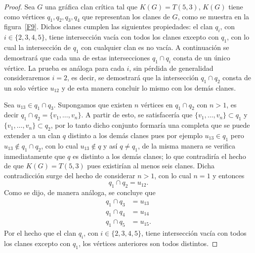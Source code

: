 \documentclass[12pt]{book}
\theoremstyle{definition}
\begin{document}
\begin{proof}
Sea $G$ una gráfica clan crítica tal que $K(G)=T(5,3)$, $K(G)$ tiene como vértices $q_1,q_2,q_3,q_4$ que representan los clanes de $G$, como se muestra en la figura~\ref{F9}. Dichos clanes cumplen las siguientes propiedades: el clan $q_i$, con $i\in \{2,3,4,5\}$, tiene intersección vacía con todos los clanes excepto con $q_1$, con lo cual la intersección de $q_1$ con cualquier clan es no vacía. 
A continuación se demostrará que cada una de estas intersecciones $q_1\cap q_i$ consta de un único vértice. La prueba es análoga para cada $i$, sin pérdida de generalidad consideraremos $i=2$, es decir, se demostrará que la intersección $q_1\cap q_2$ consta de un solo vértice $u_{12}$ y de esta manera concluir lo mismo con los demás clanes.

Sea $u_{13}\in q_1\cap q_3$. Supongamos que existen $n$ vértices en $q_1\cap q_2$ con $n>1$, es decir $q_1\cap q_2=\{v_1,\dots,v_n\}$. A partir de esto, se satisfacería que $\{v_1,\dots,v_n\}\subset q_1$ y $\{v_1,\dots,v_n\}\subset q_2$, por lo tanto dicho conjunto formaría una completa que se puede extender a un clan $q$ distinto a los demás clanes pues por ejemplo $u_{13}\in q_1$ pero $u_{13}\notin q_1\cap q_2$, con lo cual $u_{13}\notin q$ y así $q\neq q_1$, de la misma manera se verifica inmediatamente que $q$ es distinto a los demás clanes; lo que contradiría el hecho de que $K(G)=T(5,3)$ pues existirían al menos seis clanes. Dicha contradicción surge del hecho de considerar $n>1$, con lo cual $n=1$ y entonces
\begin{equation*}
q_1\cap q_2=u_{12}.
\end{equation*}
Como se dijo, de manera análoga, se concluye que 
\begin{equation*}
\begin{aligned}
	q_1\cap q_3 &= u_{13} \\
	q_1\cap q_4 &= u_{14} \\
	q_1\cap q_5 &= u_{15} .
\end{aligned}
\end{equation*}
Por el hecho que el clan $q_i$, con $i\in \{2,3,4,5\}$, tiene intersección vacía con todos los clanes excepto con $q_1$, los vértices anteriores son todos distintos.




\end{proof}






\end{document}
